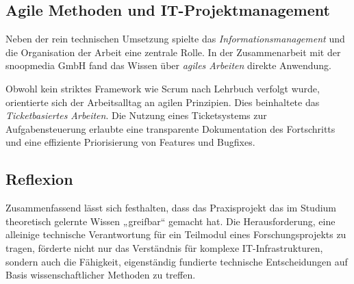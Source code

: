 \subsection{Agile Methoden und IT-Projektmanagement}
Neben der rein technischen Umsetzung spielte das \textit{Informationsmanagement} und die Organisation der Arbeit eine zentrale Rolle. In der Zusammenarbeit mit der snoopmedia GmbH 
fand das Wissen über \textit{agiles Arbeiten} direkte Anwendung.

Obwohl kein striktes Framework wie Scrum nach Lehrbuch verfolgt wurde, orientierte sich der Arbeitsalltag an agilen Prinzipien. Dies beinhaltete das \textit{Ticketbasiertes Arbeiten}.
Die Nutzung eines Ticketsystems zur Aufgabensteuerung erlaubte eine transparente Dokumentation des Fortschritts und eine effiziente 
Priorisierung von Features und Bugfixes.

\subsection{Reflexion}
Zusammenfassend lässt sich festhalten, dass das Praxisprojekt das im Studium theoretisch gelernte Wissen „greifbar“ gemacht hat. Die Herausforderung, eine alleinige technische 
Verantwortung für ein Teilmodul eines Forschungsprojekts zu tragen, förderte nicht nur das Verständnis für komplexe IT-Infrastrukturen, sondern auch die Fähigkeit, eigenständig 
fundierte technische Entscheidungen auf Basis wissenschaftlicher Methoden zu treffen.
